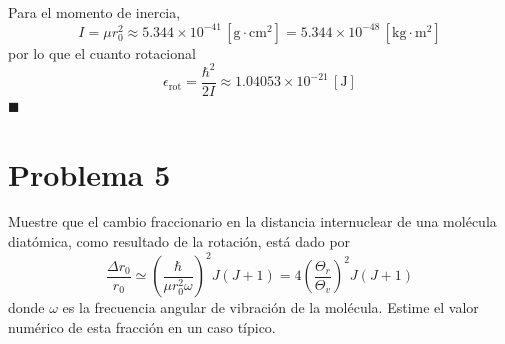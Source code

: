 \documentclass[]{article}
\numberwithin{equation}{section}
\newcommand{\0}{\textcolor{gray}{0}}
\newcommand{\qed}{\hfill\(\blacksquare\)}
\begin{document}
Para el momento de inercia,
\begin{equation}
	I = \mu r_0^2 \approx 5.344 \times 10^{-41} \, \mathrm{[g \cdot cm^2]} =  5.344 \times 10^{-48} \, \mathrm{[kg \cdot m^2]}
\end{equation}
por lo que el cuanto rotacional
\begin{equation}
	\epsilon_{\mathrm{rot}} = \frac{\hbar^2}{2 I} \approx 1.04053\times 10^{-21} \, \mathrm{[J]}
\end{equation}
\qed

\section{Problema 5}
Muestre que el cambio fraccionario en la distancia internuclear de una molécula diatómica, como resultado de la rotación, está dado por
\begin{equation}
	\frac{\Delta r_0}{r_0} \simeq \left(\frac{\hbar}{\mu r_0^2 \omega}\right)^2 J(J+1) = 4 \left(\frac{\Theta_r}{\Theta_v}\right)^2 J(J+1)
\end{equation}
donde $\omega$ es la frecuencia angular de vibración de la molécula. Estime el valor numérico de esta fracción en un caso típico.
\\
\end{document}
